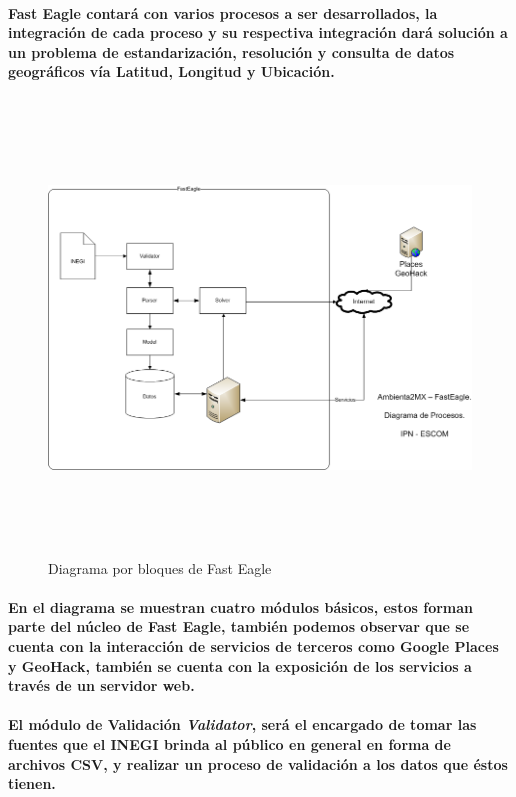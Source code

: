       \paragraph{Fast Eagle contará con varios procesos a ser desarrollados, la integración de cada proceso y su respectiva integración dará solución a un problema de estandarización, resolución y consulta de datos geográficos vía Latitud, Longitud y Ubicación.}
    \newpage
      \begin{landscape}
        \begin{figure}[b!]
        \centering
        \includegraphics[width=22.5cm,height=12cm]{./images/DiagramaFastEagle.png}
        \caption{Diagrama por bloques de Fast Eagle}
      \end{figure}
      \end{landscape}
    \newpage
    \paragraph{En el diagrama se muestran cuatro módulos básicos, estos forman parte del núcleo de Fast Eagle, también podemos observar que se cuenta con la interacción de servicios de terceros como Google Places y GeoHack, también se cuenta con la exposición de los servicios a través de un servidor  web.}
    \paragraph{El módulo de Validación \textbf{\emph{Validator}}, será el encargado de tomar las fuentes que el INEGI brinda al público en general en forma de archivos CSV, y realizar un proceso de validación a los datos que éstos tienen.}
